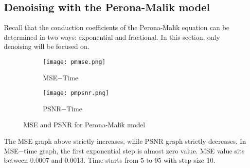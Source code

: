 \documentclass[12pt]{report}
\begin{document}
\begin{tableofcontents}
			\section{Denoising with the Perona-Malik model}
Recall that the conduction coefficients of the Perona-Malik equation can be determined in two ways: exponential and fractional. In this section, only denoising will be focused on.
			\begin{figure}[H]
				\centering
				\begin{subfigure}{0.49\textwidth}
				\texttt{[image: pmmse.png]}
				\caption{MSE$-$Time}
				\end{subfigure}
				\begin{subfigure}{0.49\textwidth}
				\texttt{[image: pmpsnr.png]}
				\caption{PSNR$-$Time}
				\end{subfigure}
				\caption{MSE and PSNR for Perona-Malik model}
			\end{figure}
\noindent
The MSE graph above strictly increases, while PSNR graph strictly decreases. In MSE$-$time graph, the first exponential step is almost zero value. MSE value sits between 0.0007 and 0.0013. Time starts from 5 to 95 with step size 10.

\end{tableofcontents}
\end{document}

